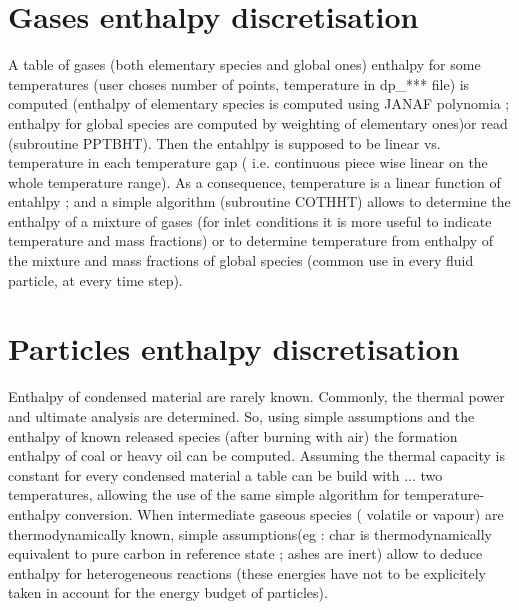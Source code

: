 \section{Gases enthalpy discretisation}

A table of gases ({\small both elementary species and global ones}) enthalpy for
some temperatures ({\small user choses number of points, temperature in dp\_***
file}) is computed ({\small enthalpy of elementary species is computed using
JANAF polynomia ; enthalpy for global species are computed by weighting of
elementary ones})or read ({\small subroutine PPTBHT}). Then the entahlpy is
supposed to be linear vs. temperature in each temperature gap ({\small
i.e. continuous piece wise linear on the whole temperature range}). As a
consequence, temperature is a linear function of entahlpy ; and a simple
algorithm ({\small subroutine COTHHT}) allows to determine the enthalpy of a
mixture of gases ({\small for inlet conditions it is more useful to indicate
temperature and mass fractions}) or to determine temperature from enthalpy of
the mixture and mass fractions of global species ({\small common use in every
fluid particle, at every time step}).
\section{Particles enthalpy discretisation}

Enthalpy of condensed material are rarely known. Commonly, the thermal power and
ultimate analysis are determined. So, using simple assumptions and the enthalpy
of known released species ({\small after burning with air}) the formation
enthalpy of coal or heavy oil can be computed. Assuming the thermal capacity is
constant for every condensed material a table can be build with ... two
temperatures, allowing the use of the same simple algorithm for
temperature-enthalpy conversion. When intermediate gaseous species ({\small
volatile or vapour}) are thermodynamically known, simple assumptions({\small eg
: char is thermodynamically equivalent to pure carbon in reference state ; ashes
are inert}) allow to deduce enthalpy for heterogeneous reactions ({\small these
energies have not to be explicitely taken in account for the energy budget of
particles}).

